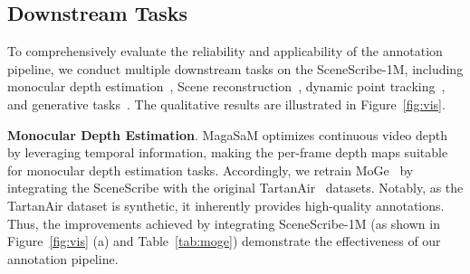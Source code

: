 


\subsection{Downstream Tasks}
To comprehensively evaluate the reliability and applicability of the annotation pipeline, we conduct multiple downstream tasks on the SceneScribe-1M, including monocular depth estimation~\cite{wang2025moge}, Scene reconstruction~\cite{wang2025vggt,zhang2024monst3r}, dynamic point tracking~\cite{karaev2025cotracker3,xiao2025spatialtrackerv2}, and generative tasks~\cite{bahmani2025ac3d}. The qualitative results are illustrated in Figure~\ref{fig:vis}. 


\noindent\textbf{Monocular Depth Estimation}. MagaSaM optimizes continuous video depth by leveraging temporal information, making the per-frame depth maps suitable for monocular depth estimation tasks. 
Accordingly, we retrain MoGe~\cite{wang2025moge} by integrating the SceneScribe with the original TartanAir~\cite{wang2020tartanair} datasets.
Notably, as the TartanAir dataset is synthetic, it inherently provides high-quality annotations. Thus, the improvements achieved by integrating SceneScribe-1M (as shown in Figure~\ref{fig:vis} (a) and Table~\ref{tab:moge}) demonstrate the effectiveness of our annotation pipeline.






